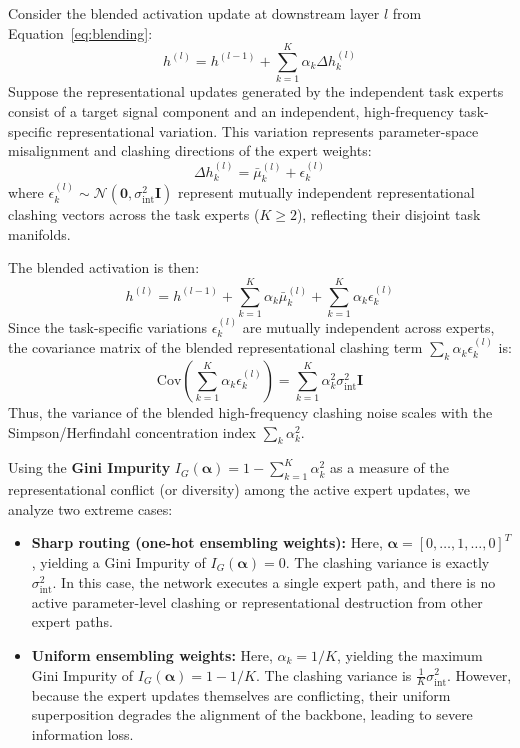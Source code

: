 Consider the blended activation update at downstream layer $l$ from Equation~\eqref{eq:blending}:
\begin{equation}
  h^{(l)} = h^{(l-1)} + \sum_{k=1}^K \alpha_k \Delta h_k^{(l)}
\end{equation}
Suppose the representational updates generated by the independent task experts consist of a target signal component and an independent, high-frequency task-specific representational variation. This variation represents parameter-space misalignment and clashing directions of the expert weights:
\begin{equation}
  \Delta h_k^{(l)} = \bar{\mu}_k^{(l)} + \epsilon_k^{(l)}
\end{equation}
where $\epsilon_k^{(l)} \sim \mathcal{N}(\mathbf{0}, \sigma_{\text{int}}^2 \mathbf{I})$ represent mutually independent representational clashing vectors across the task experts ($K \ge 2$), reflecting their disjoint task manifolds. 

The blended activation is then:
\begin{equation}
  h^{(l)} = h^{(l-1)} + \sum_{k=1}^K \alpha_k \bar{\mu}_k^{(l)} + \sum_{k=1}^K \alpha_k \epsilon_k^{(l)}
\end{equation}
Since the task-specific variations $\epsilon_k^{(l)}$ are mutually independent across experts, the covariance matrix of the blended representational clashing term $\sum_k \alpha_k \epsilon_k^{(l)}$ is:
\begin{equation}
  \text{Cov}\left( \sum_{k=1}^K \alpha_k \epsilon_k^{(l)} \right) = \sum_{k=1}^K \alpha_k^2 \sigma_{\text{int}}^2 \mathbf{I}
\end{equation}
Thus, the variance of the blended high-frequency clashing noise scales with the Simpson/Herfindahl concentration index $\sum_k \alpha_k^2$. 

Using the \textbf{Gini Impurity} $I_G(\boldsymbol{\alpha}) = 1 - \sum_{k=1}^K \alpha_k^2$ as a measure of the representational conflict (or diversity) among the active expert updates, we analyze two extreme cases:
\begin{itemize}
    \item \textbf{Sharp routing (one-hot ensembling weights):} Here, $\boldsymbol{\alpha} = [0, \dots, 1, \dots, 0]^T$, yielding a Gini Impurity of $I_G(\boldsymbol{\alpha}) = 0$. The clashing variance is exactly $\sigma_{\text{int}}^2$. In this case, the network executes a single expert path, and there is no active parameter-level clashing or representational destruction from other expert paths.
    \item \textbf{Uniform ensembling weights:} Here, $\alpha_k = 1/K$, yielding the maximum Gini Impurity of $I_G(\boldsymbol{\alpha}) = 1 - 1/K$. The clashing variance is $\frac{1}{K} \sigma_{\text{int}}^2$. However, because the expert updates themselves are conflicting, their uniform superposition degrades the alignment of the backbone, leading to severe information loss.
\end{itemize}

